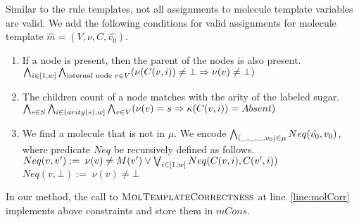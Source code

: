 %
Similar to the rule templates, not all assignments to molecule template variables
are valid.
We add the following conditions for
valid assignments for molecule template $\hat{m} = (V, \nu, C, \hat{v_0})$.
\begin{enumerate}
\item If a node is present, then the parent of the nodes is also present.\\
  $
  \bigwedge_{i\in[1,w]}\bigwedge_{{\text{internal node } v \in V}} (\nu(C(v,i) ) \neq \bot \Rightarrow \nu( v ) \neq \bot )  
  $
\item The children count of a node matches with the arity of the labeled sugar.\\
  $
  \bigwedge_{s \in S} \bigwedge_{i \in (arity(s),w] }\bigwedge_{v \in V} (\nu(v) = s \Rightarrow \kappa( C(v,i) ) = Absent )
  $
\item We find a molecule that is not in $\mu$.
  We encode $\bigwedge_{{(\_,\_,\_, v_0)\in \mu}}  Neq(\hat{v_0},v_0)$, where
   predicate $Neq$ be recursively defined as follows.\\
  $Neq(v, v') :=\; \nu(v) \neq M(v') \lor
  \bigvee_{{i \in [1,w]}} Neq( C(v,i), C(v',i ) )$\\
  $Neq(v,\bot) :=\;  \nu(v) \neq \bot$
\end{enumerate}
%
In our method, the call to $\textsc{MolTemplateCorrectness}$ at
line~\ref{line:molCorr} implements above constraints and store them in
$mCons$. 


